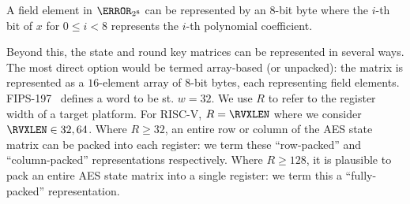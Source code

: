 
A field element in $\F_{2^8}$ can be represented by an
$8$-bit byte
where the $i$-th bit of $x$ for $0 \leq i < 8$ represents the $i$-th 
polynomial coefficient.

Beyond this, the state and round key matrices can be represented in
several ways.
The most direct option would be termed
array-based (or unpacked):
the matrix is represented as a $16$-element array of $8$-bit bytes, each
representing field elements.
FIPS-197~\cite{FIPS:197} defines a word to be st. $w = 32$.
We use $R$ to refer to the register width of a target platform.
For RISC-V, $R = \RVXLEN$ where we consider $\RVXLEN \in {32,64}$.
Where $R \geq  32$,
an entire row or column of the AES state matrix can be packed into each 
register:
we term these
   ``row-packed''  
and
``column-packed''
representations respectively.
Where $R \geq 128$, 
it is plausible to pack
an entire AES state matrix
into a single register: 
we term this a 
 ``fully-packed'' 
representation.


